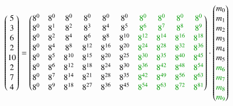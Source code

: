 \[
\begin{pmatrix}
	5 \\ 3 \\ 6 \\ 2 \\ 10 \\ 2 \\ 7 \\ 4 \\
\end{pmatrix}
=
\begin{pmatrix}
	8^0&    8^0&    8^0&    8^0&    8^0&    8^0&    \textcolor{darkgreen}{8^0}&    \textcolor{darkgreen}{8^0}&    \textcolor{darkgreen}{8^0}&    \textcolor{darkgreen}{8^0}\\
	8^0&	8^1&	8^2&	8^3&	8^4&	8^5&	\textcolor{darkgreen}{8^6}&	   \textcolor{darkgreen}{8^7}&    \textcolor{darkgreen}{8^8}&    \textcolor{darkgreen}{8^9}\\
	8^0&	8^2&	8^4&	8^6&	8^8& 8^{10}& \textcolor{darkgreen}{8^{12}}& \textcolor{darkgreen}{8^{14}}& \textcolor{darkgreen}{8^{16}}& \textcolor{darkgreen}{8^{18}}\\
	8^0&	8^4&	8^8& 8^{12}& 8^{16}& 8^{20}& \textcolor{darkgreen}{8^{24}}& \textcolor{darkgreen}{8^{28}}& \textcolor{darkgreen}{8^{32}}& \textcolor{darkgreen}{8^{36}}\\
	8^0&	8^5& 8^{10}& 8^{15}& 8^{20}& 8^{25}& \textcolor{darkgreen}{8^{30}}& \textcolor{darkgreen}{8^{35}}& \textcolor{darkgreen}{8^{40}}& \textcolor{darkgreen}{8^{45}}\\
	8^0&	8^6& 8^{12}& 8^{18}& 8^{24}& 8^{30}& \textcolor{darkgreen}{8^{36}}& \textcolor{darkgreen}{8^{42}}& \textcolor{darkgreen}{8^{48}}& \textcolor{darkgreen}{8^{54}}\\
	8^0&	8^7& 8^{14}& 8^{21}& 8^{28}& 8^{35}& \textcolor{darkgreen}{8^{42}}& \textcolor{darkgreen}{8^{49}}& \textcolor{darkgreen}{8^{56}}& \textcolor{darkgreen}{8^{63}}\\
	8^0&	8^9& 8^{18}& 8^{27}& 8^{36}& 8^{45}& \textcolor{darkgreen}{8^{54}}& \textcolor{darkgreen}{8^{63}}& \textcolor{darkgreen}{8^{72}}& \textcolor{darkgreen}{8^{81}}\\
\end{pmatrix}
\cdot
\begin{pmatrix}
	m_0 \\ m_1 \\ m_2 \\ m_3 \\ m_4 \\ m_5 \\ \textcolor{darkgreen}{m_6} \\ \textcolor{darkgreen}{m_7} \\ \textcolor{darkgreen}{m_8} \\ \textcolor{darkgreen}{m_9} \\
\end{pmatrix}
\]
